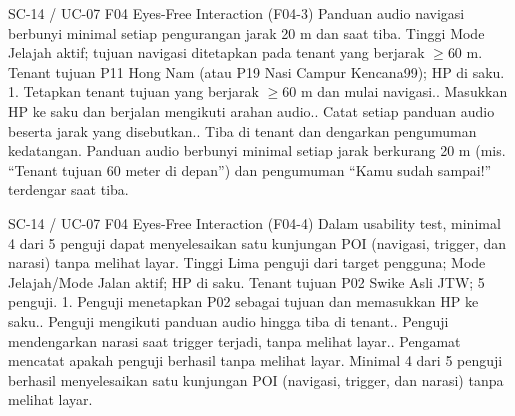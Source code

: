 \renewcommand{\tcactual}{Sesuai ekspektasi pada perangkat Android (Audio cue 20 m lolos (\texttt{07-navigation})). Panduan audio berbunyi minimal setiap jarak berkurang 20 m (mis. ``Tenant tujuan 60 meter di depan'') dan pengumuman ``Kamu sudah sampai!'' terdengar saat tiba.}
{SC-14 / UC-07}
{F04 Eyes-Free Interaction}
{(F04-3) Panduan audio navigasi berbunyi minimal setiap pengurangan jarak 20 m dan saat tiba.}
{Tinggi}
{Mode Jelajah aktif; tujuan navigasi ditetapkan pada tenant yang berjarak \(\ge\)60 m.}
{Tenant tujuan P11 Hong Nam (atau P19 Nasi Campur Kencana99); HP di saku.}
{1. Tetapkan tenant tujuan yang berjarak \(\ge\)60 m dan mulai navigasi.. Masukkan HP ke saku dan berjalan mengikuti arahan audio.. Catat setiap panduan audio beserta jarak yang disebutkan.. Tiba di tenant dan dengarkan pengumuman kedatangan.}
{Panduan audio berbunyi minimal setiap jarak berkurang 20 m (mis. ``Tenant tujuan 60 meter di depan'') dan pengumuman ``Kamu sudah sampai!'' terdengar saat tiba.}

\renewcommand{\tcactual}{Sesuai ekspektasi pada perangkat Android. Minimal 4 dari 5 penguji berhasil menyelesaikan satu kunjungan POI (navigasi, trigger, dan narasi) tanpa melihat layar.}
{SC-14 / UC-07}
{F04 Eyes-Free Interaction}
{(F04-4) Dalam usability test, minimal 4 dari 5 penguji dapat menyelesaikan satu kunjungan POI (navigasi, trigger, dan narasi) tanpa melihat layar.}
{Tinggi}
{Lima penguji dari target pengguna; Mode Jelajah/Mode Jalan aktif; HP di saku.}
{Tenant tujuan P02 Swike Asli JTW; 5 penguji.}
{1. Penguji menetapkan P02 sebagai tujuan dan memasukkan HP ke saku.. Penguji mengikuti panduan audio hingga tiba di tenant.. Penguji mendengarkan narasi saat trigger terjadi, tanpa melihat layar.. Pengamat mencatat apakah penguji berhasil tanpa melihat layar.}
{Minimal 4 dari 5 penguji berhasil menyelesaikan satu kunjungan POI (navigasi, trigger, dan narasi) tanpa melihat layar.}

